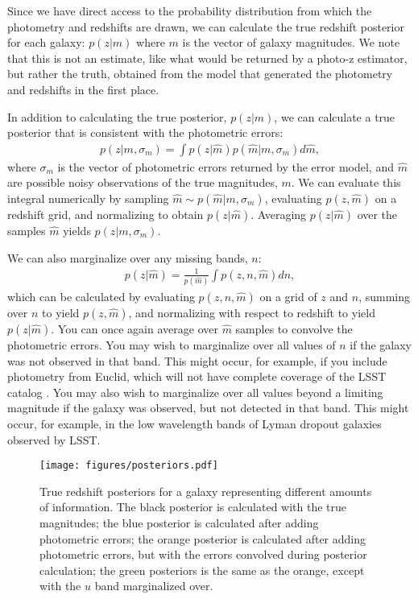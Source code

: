 \documentclass[twocolumn]{aastex631}
\begin{document}
Since we have direct access to the probability distribution from which the photometry and redshifts are drawn, we can calculate the true redshift posterior for each galaxy: $p(z|m)$ where $m$ is the vector of galaxy magnitudes.
We note that this is not an estimate, like what would be returned by a photo-z estimator, but rather the truth, obtained from the model that generated the photometry and redshifts in the first place.

In addition to calculating the true posterior, $p(z|m)$, we can calculate a true posterior that is consistent with the photometric errors:
\begin{align}
    p(z|m, \sigma_m) = \int p(z|\hat{m}) p(\hat{m}|m, \sigma_m) d\hat{m},
    \label{eq:err-conv}
\end{align}
where $\sigma_m$ is the vector of photometric errors returned by the error model, and $\hat{m}$ are possible noisy observations of the true magnitudes, $m$.
We can evaluate this integral numerically by sampling $\hat{m} \sim p(\hat{m}|m, \sigma_m)$, evaluating $p(z, \hat{m})$ on a redshift grid, and normalizing to obtain $p(z|\hat{m})$.
Averaging $p(z|\hat{m})$ over the samples $\hat{m}$ yields $p(z|m, \sigma_m)$.

We can also marginalize over any missing bands, $n$:
\begin{align}
    p(z|\hat{m}) = \frac{1}{p(\hat{m})} \int p(z, n, \hat{m}) dn,
\end{align}
which can be calculated by evaluating $p(z, n, \hat{m})$ on a grid of $z$ and $n$, summing over $n$ to yield $p(z, \hat{m})$, and normalizing with respect to redshift to yield $p(z|\hat{m})$.
You can once again average over $\hat{m}$ samples to convolve the photometric errors.
You may wish to marginalize over all values of $n$ if the galaxy was not observed in that band.
This might occur, for example, if you include photometry from Euclid, which will not have complete coverage of the LSST catalog \citep{euclid}.
You may also wish to marginalize over all values beyond a limiting magnitude if the galaxy was observed, but not detected in that band.
This might occur, for example, in the low wavelength bands of Lyman dropout galaxies observed by LSST.

\begin{figure}[t!]
    \begin{centering}
        \texttt{[image: figures/posteriors.pdf]}
        \caption{
            True redshift posteriors for a galaxy representing different amounts of information.
            The black posterior is calculated with the true magnitudes;
            the blue posterior is calculated after adding photometric errors;
            the orange posterior is calculated after adding photometric errors, but with the errors convolved during posterior calculation;
            the green posteriors is the same as the orange, except with the $u$ band marginalized over.
        }
        \label{fig:posteriors}
    \end{centering}
\end{figure}
\end{document}
